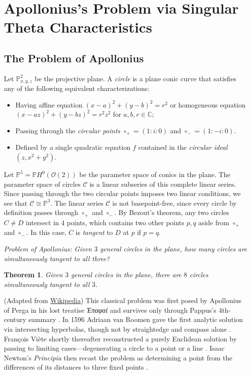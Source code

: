 \documentclass[11pt,a4paper]{article}
\renewcommand{\O}{\mathcal{O}}
\newcommand{\PP}{\mathbb{P}}
\newcommand{\CC}{\mathbb{C}}
\theoremstyle{mytheoremstyle}
\newtheorem{theorem}{Theorem}[section]
\theoremstyle{mydefinitionstyle}
\begin{document}
\section{Apollonius's Problem via Singular Theta Characteristics}
\label{sec:apollonius_singular_theta}

\subsection{The Problem of Apollonius}

\newcommand{\cp}{\circ_+}
\newcommand{\cm}{\circ_-}

Let $\PP^2_{x,y,z}$ be the projective plane. A \textit{circle} is a plane conic curve that satisfies any of the following equivalent characterizations:
\begin{itemize}
    \item Having affine equation $(x-a)^2+(y-b)^2 = r^2$ or homogeneous equation $(x-az)^2+(y-bz)^2 = r^2z^2$ for $a,b,r\in \CC$;
    \item Passing through the \textit{circular points} $\circ_+ = (1:i:0)$ and $\circ_- = (1:-i:0)$.
    \item Defined by a single quadratic equation $f$ contained in the \textit{circular ideal} $(z, x^2 + y^2)$.
\end{itemize}
Let $\PP^5 = \PP H^0(\O(2))$ be the parameter space of conics in the plane. The parameter space of circles $\mathcal{C}$ is a linear subseries of this complete linear series. Since passing through the two circular points imposes two linear conditions, we see that $\mathcal{C}\cong \PP^3$. The linear series $\mathcal{C}$ is not basepoint-free, since every circle by definition passes through $\circ_+$ and $\circ_-$. By Bezout's theorem, any two circles $C\neq D$ intersect in $4$ points, which contains two other points $p,q$ aside from $\cp$ and $\cm$. In this case, $C$ is \textit{tangent} to $D$ at $p$ if $p = q$. 

\begin{center}
    \textit{Problem of Apollonius: Given $3$ general circles in the plane, how many circles are simultaneously tangent to all three?}
\end{center}

\begin{theorem}
    Given $3$ general circles in the plane, there are $8$ circles simultaneously tangent to all $3$. 
\end{theorem}

(Adapted from \href{https://en.wikipedia.org/wiki/Problem_of_Apollonius}{Wikipedia}) This classical problem was first posed by Apollonius of Perga in his lost treatise \emph{\foreignlanguage{greek}{Ἐπαφαί}} and survives only through Pappus’s 4th-century summary \cite[1]{Heath1981}\cite[2]{Pappus1893}.  In 1596 Adriaan van Roomen gave the first analytic solution via intersecting hyperbolas, though not by straightedge and compass alone \cite[3]{Romanus1596}.  François Viète shortly thereafter reconstructed a purely Euclidean solution by passing to limiting cases—degenerating a circle to a point or a line \cite[4]{Viete1646}.  Isaac Newton’s \emph{Principia} then recast the problem as determining a point from the differences of its distances to three fixed points \cite[5]{Newton1687}.
\end{document}
